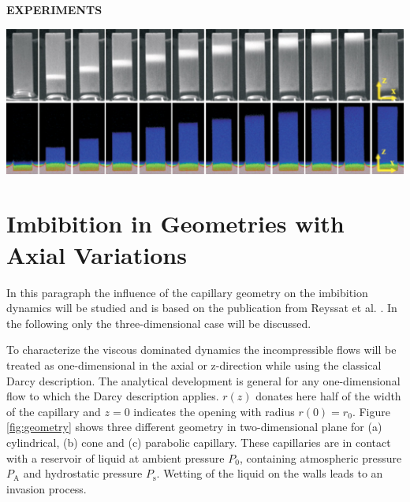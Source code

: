 \documentclass[aip, amsmath, amssymb, reprint, twocolumn, floatfix]{revtex4-1}
\newcommand{\Pa}{P_\mathrm{A}}
\newcommand{\Ps}{P_\mathrm{s}}
\begin{document}
\textbf{EXPERIMENTS}

\begin{center}
	\captionsetup{type=figure}
	\includegraphics[width = \linewidth]{../pictures/Imbibition-Height.jpeg}
	\label{fig:imbibition-height}
\end{center}

\section{Imbibition in Geometries with Axial Variations}
\label{sec:geometry}

In this paragraph the influence of the capillary geometry on the imbibition dynamics will be studied and is based on the publication from Reyssat et al. \cite{Reyssat2008}. In the following only the three-dimensional case will be discussed.
\bigskip

To characterize the viscous dominated dynamics the incompressible flows will be treated as one-dimensional in the axial or z-direction while using the classical Darcy description. The analytical development is general for any one-dimensional flow to which the Darcy description applies. $r(z)$ donates here half of the width of the capillary and $z = 0$ indicates the opening with radius $r(0) = r_0$. Figure \ref{fig:geometry} shows three different geometry in two-dimensional plane for (a) cylindrical, (b) cone and (c) parabolic capillary. These capillaries are in contact with a reservoir of liquid at ambient pressure $P_0$, containing atmospheric pressure $\Pa$ and hydrostatic pressure $\Ps$. Wetting of the liquid on the walls leads to an invasion process.

\begin{center}
	\captionsetup{type=figure}
	
	\label{fig:geometry}
\end{center}
\end{document}
